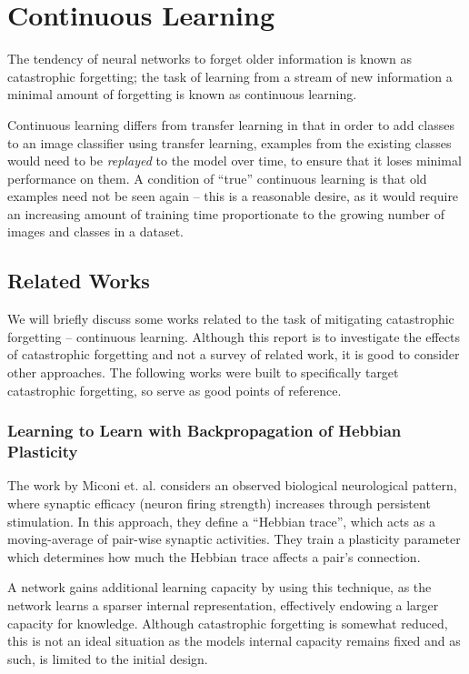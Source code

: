 \documentclass{report}
\begin{document}
	\section{Continuous Learning}
	The tendency of neural networks to forget older information is known as catastrophic forgetting; the task of learning from a stream of new information a minimal amount of forgetting is known as continuous learning. \par
	Continuous learning differs from transfer learning in that in order to add classes to an image classifier using transfer learning, examples from the existing classes would need to be \emph{replayed} to the model over time, to ensure that it loses minimal performance on them. A condition of ``true'' continuous learning is that old examples need not be seen again -- this is a reasonable desire, as it would require an increasing amount of training time proportionate to the growing number of images and classes in a dataset. \par

	\subsection{Related Works}
	We will briefly discuss some works related to the task of mitigating catastrophic forgetting -- continuous learning. Although this report is to investigate the effects of catastrophic forgetting and not a survey of related work, it is good to consider other approaches. The following works were built to specifically target catastrophic forgetting, so serve as good points of reference. \par
	
	\subsubsection{Learning to Learn with Backpropagation of Hebbian Plasticity}
	The work by Miconi et. al. \parencite{hebbian} considers an observed biological neurological pattern, where synaptic efficacy (neuron firing strength) increases through persistent stimulation. In this approach, they define a ``Hebbian trace'', which acts as a moving-average of pair-wise synaptic activities. They train a plasticity parameter which determines how much the Hebbian trace affects a pair's connection. \par
	A network gains additional learning capacity by using this technique, as the network learns a sparser internal representation, effectively endowing a larger capacity for knowledge. Although catastrophic forgetting is somewhat reduced, this is not an ideal situation as the models internal capacity remains fixed and as such, is limited to the initial design. \par
	
\end{document}
